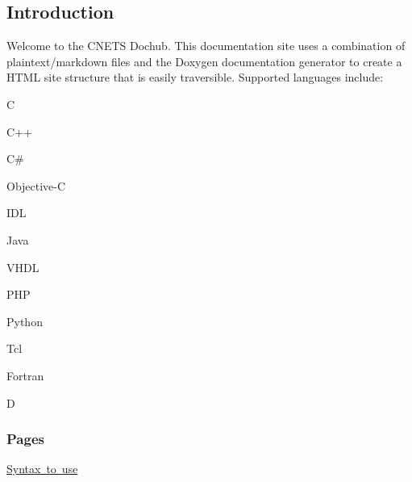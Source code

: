 \subsection*{Introduction}

Welcome to the C\+N\+E\+TS Dochub. This documentation site uses a combination of plaintext/markdown files and the Doxygen documentation generator to create a H\+T\+ML site structure that is easily traversible. Supported languages include\+:


\begin{DoxyItemize}
\item C
\item C++
\item C\#
\item Objective-\/C
\item I\+DL
\item Java
\item V\+H\+DL
\item P\+HP
\item Python
\item Tcl
\item Fortran
\item D
\end{DoxyItemize}

\subsubsection*{Pages}


\begin{DoxyItemize}
\item \mbox{\hyperlink{correctSyntaxPage}{Syntax to use}} 
\end{DoxyItemize}